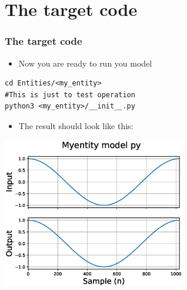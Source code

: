 \documentclass{sdkslides}
\begin{document}
\renewcommand{\sectionname}{The target code}
\section*{\sectionname}
\nextlines[45]
\begin{frame}[t,fragile]
    \frametitle{\sectionname} 
    \begin{itemize}
        \item Now you are ready to run you model
    \end{itemize}
\begin{lstlisting}
cd Entities/<my_entity>
#This is just to test operation 
python3 <my_entity>/__init__.py  
\end{lstlisting}
    \begin{itemize}
        \item The result should look like this:
    \end{itemize}
    \begin{center}
        \includegraphics[width=0.6\textwidth]{./Pics/inv_py.eps}
    \end{center}
\end{frame}

\renewcommand{\sectionname}{The target code}
\end{document}
